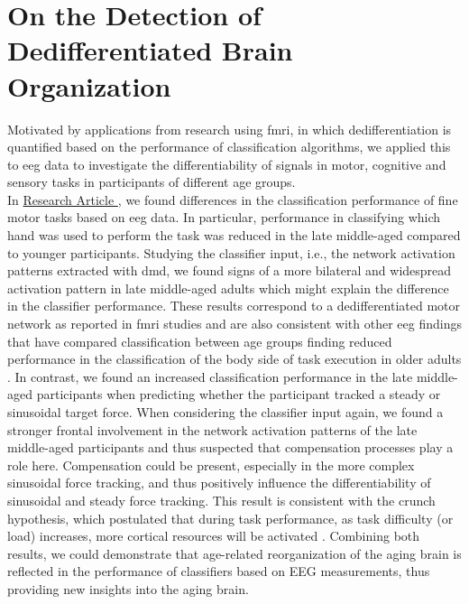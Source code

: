 \section{On the Detection of Dedifferentiated Brain Organization}
Motivated by applications from research using \gls{fmri}, in which dedifferentiation is quantified based on the performance of classification algorithms, we applied this to \gls{eeg} data to investigate the differentiability of signals in motor, cognitive and sensory tasks in participants of different age groups.\\
In \hyperref[results:paperI]{Research Article }, we found differences in the classification performance of fine motor tasks based on \gls{eeg} data. In particular, performance in classifying which hand was used to perform the task was reduced in the late middle-aged compared to younger participants. Studying the classifier input, i.e., the network activation patterns extracted with \gls{dmd}, we found signs of a more bilateral and widespread activation pattern in late middle-aged adults which might explain the difference in the classifier performance. These results correspond to a dedifferentiated motor network as reported in \gls{fmri} studies and are also consistent with other \gls{eeg} findings that have compared classification between age groups finding reduced performance in the classification of the body side of task execution in older adults \cite{Chen2019, Zich2015, Carb2011, Cassedy2020}. In contrast, we found an increased classification performance in the late middle-aged participants when predicting whether the participant tracked a steady or sinusoidal target force. When considering the classifier input again, we found a stronger frontal involvement in the network activation patterns of the late middle-aged participants and thus suspected that compensation processes play a role here. Compensation could be present, especially in the more complex sinusoidal force tracking, and thus positively influence the differentiability of sinusoidal and steady force tracking. This result is consistent with the \gls{crunch} hypothesis, which postulated that during task performance, as task difficulty (or load) increases, more cortical resources will be activated \cite{Festini2018}. Combining both results, we could demonstrate that age-related reorganization of the aging brain is reflected in the performance of classifiers based on EEG measurements, thus providing new insights into the aging brain.\\
